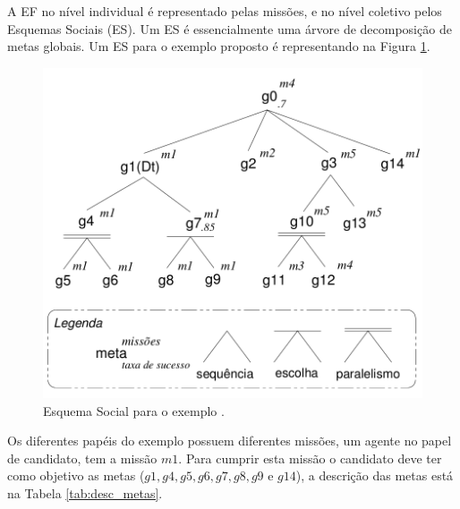   A EF no nível individual é representado pelas missões, e no nível coletivo pelos Esquemas Sociais (ES). Um ES é essencialmente uma árvore de decomposição de metas globais. Um ES para o exemplo proposto é representando na Figura \ref{fig:es_exemplo}.
  
\begin{figure}[ht]
\centering
\includegraphics[scale=0.35]{imagens/ES2.png}
\caption{Esquema Social para o exemplo \cite{hubner2003modelo}.}
\label{fig:es_exemplo}
\end{figure}

Os diferentes papéis do exemplo possuem diferentes missões, um agente no papel de candidato, tem a missão $m1$. Para cumprir esta missão o candidato deve ter como objetivo as metas ($g1, g4, g5, g6, g7, g8, g9$ e $g14$), a descrição das metas está na Tabela \ref{tab:desc_metas}.

